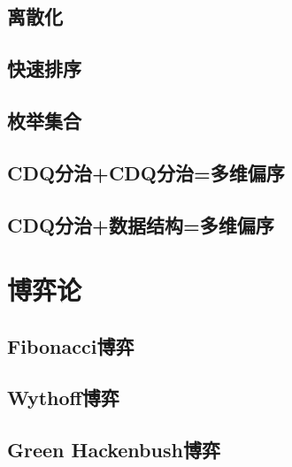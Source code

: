 \documentclass[twocolumn,a4]{article}  %
\begin{document}
	 	\subsection{离散化}
	 	 	
	 	 	
	 	\subsection{快速排序}
	 	 	
	 	 	
 	 	\subsection{枚举集合}
	 	 	
	 	 	
	 	\subsection{CDQ分治+CDQ分治=多维偏序}
	 	 	

		\subsection{CDQ分治+数据结构=多维偏序}
	 	 	
	
	\section{博弈论}
		\subsection{Fibonacci博弈}
	 	 	
	 	 	
		\subsection{Wythoff博弈}
	 	 	
	 	 	
		\subsection{Green Hackenbush博弈}
	 	 	
\end{document}
